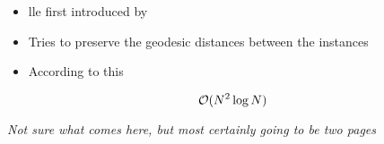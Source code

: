 \begin{itemize}
	\item \Gls{lle} first introduced by \cite{tenenbaum2000global}
	\item Tries to preserve the geodesic distances between the instances \cite{HandsOnMLCh8}
	\item According to this \cite{DRUnsupervisedNearestNeighbors}
\end{itemize}

$$\mathcal{O}(N^2 \log N)$$

\clearpage

\begin{center}
	\textit{Not sure what comes here, but most certainly going to be two pages}
\end{center}
